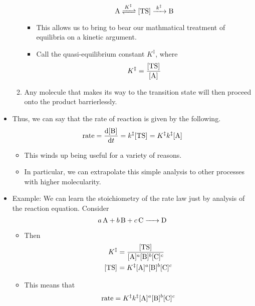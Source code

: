 \documentclass[../notes.tex]{subfiles}
\begin{document}
\begin{itemize}
\begin{enumerate}
\begin{itemize}
            \begin{equation*}
                \ce{A <=>[$K^\ddagger$] [TS] ->[$k^\ddagger$] B}
            \end{equation*}
            \item This allows us to bring to bear our mathmatical treatment of equilibria on a kinetic argument.
            \item Call the quasi-equilibrium constant $K^\ddagger$, where
            \begin{equation*}
                K^\ddagger = \frac{\cnc{TS}}{\cnc{A}}
            \end{equation*}
        \end{itemize}
        \item Any molecule that makes its way to the transition state will then proceed onto the product barrierlessly.
    \end{enumerate}
    \item Thus, we can say that the rate of reaction is given by the following.
    \begin{equation*}
        \text{rate} = \dv{\cnc{B}}{t}
        = k^\ddagger\cnc{TS}
        = K^\ddagger k^\ddagger\cnc{A}
    \end{equation*}
    \begin{itemize}
        \item This winds up being useful for a variety of reasons.
        \item In particular, we can extrapolate this simple analysis to other processes with higher molecularity.
    \end{itemize}
    \item Example: We can learn the stoichiometry of the rate law just by analysis of the reaction equation. Consider
    \begin{equation*}
        \ce{$a$A + $b$B + $c$C -> D}
    \end{equation*}
    \begin{itemize}
        \item Then
        \begin{align*}
            K^\ddagger &= \frac{\cnc{TS}}{\cnc{A}^a\cnc{B}^b\cnc{C}^c}\\
            \cnc{TS} &= K^\ddagger\cnc{A}^a\cnc{B}^b\cnc{C}^c
        \end{align*}
        \item This means that
        \begin{equation*}
            \text{rate} = K^\ddagger k^\ddagger\cnc{A}^a\cnc{B}^b\cnc{C}^c

\end{equation*}
\end{itemize}
\end{itemize}
\end{document}
